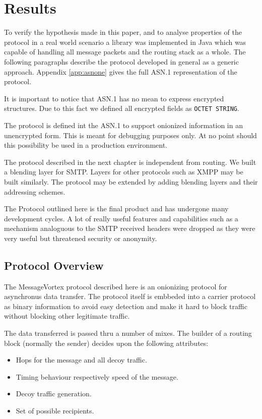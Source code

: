 
\part{Results}
To verify the hypothesis made in this paper, and to analyse properties of the protocol in a real world scenario a library was implemented in Java which was capable of handling all message packets and the routing stack as a whole. The following paragraphs describe the protocol developed in general as a generic approach. Appendix \ref{app:asnone} gives the full ASN.1 representation of the protocol. 

It is important to notice that ASN.1 has no mean to express encrypted structures. Due to this fact we defined all encrypted fields as \verb|OCTET STRING|. 

The protocol is defined int the ASN.1 to support onionized information in an unencrypted form. This is meant for debugging purposes only. At no point should this possibility be used in a production environment.

The protocol described in the next chapter is independent from routing. We built a blending layer for SMTP. Layers for other protocols such as XMPP may be built similarly. The protocol may be extended by adding blending layers and their addressing schemes.

The Protocol outlined here is the final product and has undergone many development cycles. A lot of really useful features and capabilities such as a mechanism analoguous to the SMTP received headers were dropped as they were very useful but threatened security or anonymity.

\chapter{Protocol Overview}
The MessageVortex protocol described here is an onionizing protocol for asynchronus data transfer. The protocol itself is embbeded into a carrier protocol as binary information to avoid easy detection and make it hard to block traffic without blocking other legitimate traffic.

The data transferred is passed thru a number of mixes. The builder of a routing block (normally the sender) decides upon the following attributes:
\begin{itemize}
	\item Hops for the message and all decoy traffic.
	\item Timing behaviour respectively speed of the message.
	\item Decoy traffic generation.
	\item Set of possible recipients.
\end{itemize}

